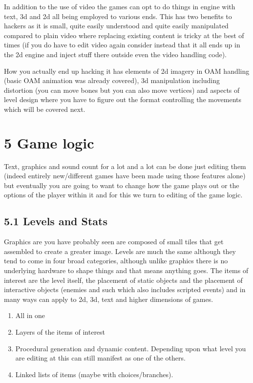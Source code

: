 \documentclass[
]{book}
\providecommand{\tightlist}{%
  \setlength{\itemsep}{0pt}\setlength{\parskip}{0pt}}
\begin{document}
In addition to the use of video the games can opt to do things in engine with text, 3d and 2d all being employed to various ends. This has two benefits to hackers as it is small, quite easily understood and quite easily manipulated compared to plain video where replacing existing content is tricky at the best of times (if you do have to edit video again consider instead that it all ends up in the 2d engine and inject stuff there outside even the video handling code).

How you actually end up hacking it has elements of 2d imagery in OAM handling (basic OAM animation was already covered), 3d manipulation including distortion (you can move bones but you can also move vertices) and aspects of level design where you have to figure out the format controlling the movements which will be covered next.

\hypertarget{game-logic}{%
\chapter{5 Game logic}\label{game-logic}}

Text, graphics and sound count for a lot and a lot can be done just editing them (indeed entirely new/different games have been made using those features alone) but eventually you are going to want to change how the game plays out or the options of the player within it and for this we turn to editing of the game logic.

\hypertarget{levels-and-stats}{%
\section{5.1 Levels and Stats}\label{levels-and-stats}}

Graphics are you have probably seen are composed of small tiles that get assembled to create a greater image. Levels are much the same although they tend to come in four broad categories, although unlike graphics there is no underlying hardware to shape things and that means anything goes. The items of interest are the level itself, the placement of static objects and the placement of interactive objects (enemies and such which also includes scripted events) and in many ways can apply to 2d, 3d, text and higher dimensions of games.

\begin{enumerate}
\def\labelenumi{\arabic{enumi}.}
\tightlist
\item
  All in one
\item
  Layers of the items of interest
\item
  Procedural generation and dynamic content. Depending upon what level you are editing at this can still manifest as one of the others.
\item
  Linked lists of items (maybe with choices/branches).
\end{enumerate}
\end{document}
